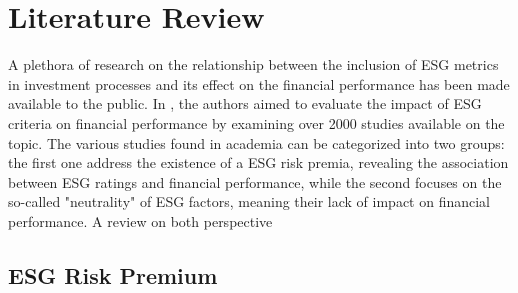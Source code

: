 \documentclass[11pt,a4paper]{article}
\begin{document}
\clearpage

\section{Literature Review}\label{sec:literature_review}

A plethora of research on the relationship between the inclusion of ESG metrics in investment processes and its effect on the financial performance has been made available to the public. 
In , the authors aimed to evaluate the impact of ESG criteria on financial performance by examining over 2000 studies available on the topic.
The various studies found in academia can be categorized into two groups: the first one address the existence of a ESG risk premia, revealing the association between ESG ratings and financial performance, while the second focuses on the so-called "neutrality" of ESG factors, meaning their lack of impact on financial performance.
A review on both perspective 

\subsection{ESG Risk Premium}
\end{document}
